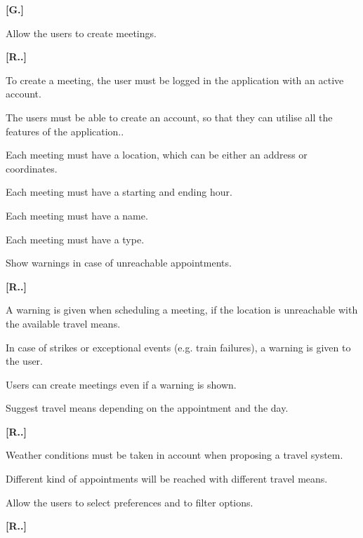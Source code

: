 \begin{list}
{\bfseries{}[G.]~}
{
}
    \item Allow the users to create meetings.
	\begin{list}
	{\bfseries{}[R..]~}
	{
	}
        \item To create a meeting, the user must be logged in the application with an active account.
        \item The users must be able to create an account, so that they can utilise all the features of the application..
        \item Each meeting must have a location, which can be either an address or coordinates.
        \item Each meeting must have a starting and ending hour.
        \item Each meeting must have a name.
        \item Each meeting must have a type.
    \end{list}
    \item Show warnings in case of unreachable appointments.
    \begin{list}
	{\bfseries{}[R..]~}
	{
	}
        \item A warning is given when scheduling a meeting, if the location is unreachable with the available travel means.
        \item In case of strikes or exceptional events (e.g. train failures), a warning is given to the user. 
        \item Users can create meetings even if a warning is shown.
    \end{list}
    \item Suggest travel means depending on the appointment and the day.
    \begin{list}
	{\bfseries{}[R..]~}
	{
	}
        \item Weather conditions must be taken in account when proposing a travel system.
        \item Different kind of appointments will be reached with different travel means.
    \end{list}
    \item Allow the users to select preferences and to filter options.
    \begin{list}
	{\bfseries{}[R..]~}

\end{list}
\end{list}
